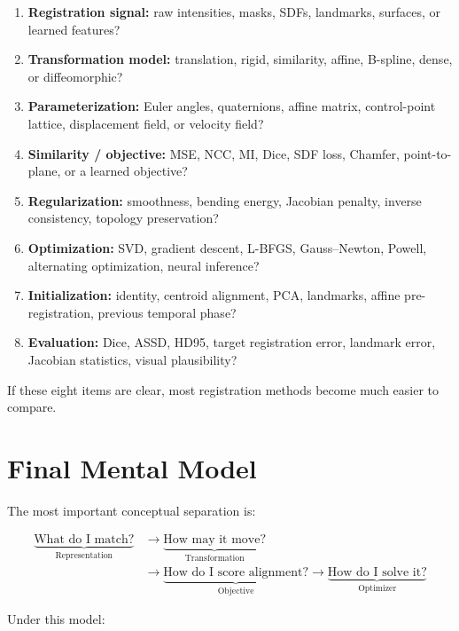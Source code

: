 \documentclass[11pt,a4paper]{article}
\begin{document}
\begin{enumerate}
  \item \textbf{Registration signal:} raw intensities, masks, SDFs, landmarks, surfaces, or learned features?
  \item \textbf{Transformation model:} translation, rigid, similarity, affine, B-spline, dense, or diffeomorphic?
  \item \textbf{Parameterization:} Euler angles, quaternions, affine matrix, control-point lattice, displacement field, or velocity field?
  \item \textbf{Similarity / objective:} MSE, NCC, MI, Dice, SDF loss, Chamfer, point-to-plane, or a learned objective?
  \item \textbf{Regularization:} smoothness, bending energy, Jacobian penalty, inverse consistency, topology preservation?
  \item \textbf{Optimization:} SVD, gradient descent, L-BFGS, Gauss--Newton, Powell, alternating optimization, neural inference?
  \item \textbf{Initialization:} identity, centroid alignment, PCA, landmarks, affine pre-registration, previous temporal phase?
  \item \textbf{Evaluation:} Dice, ASSD, HD95, target registration error, landmark error, Jacobian statistics, visual plausibility?
\end{enumerate}

If these eight items are clear, most registration methods become much easier to compare.

\section{Final Mental Model}

The most important conceptual separation is:

\[
\boxed{
\begin{aligned}
\underbrace{\text{What do I match?}}_{\text{Representation}}
&\rightarrow
\underbrace{\text{How may it move?}}_{\text{Transformation}}\\[1mm]
&\rightarrow
\underbrace{\text{How do I score alignment?}}_{\text{Objective}}
\rightarrow
\underbrace{\text{How do I solve it?}}_{\text{Optimizer}}
\end{aligned}
}
\]

Under this model:
\end{document}
